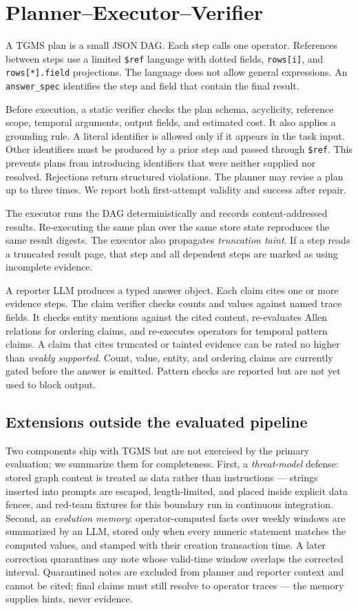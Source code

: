 \documentclass[11pt]{article}
\begin{document}
\section{Planner--Executor--Verifier}
\label{sec:pev}
A TGMS plan is a small JSON DAG. Each step calls one operator. References
between steps use a limited \texttt{\$ref} language with dotted fields,
\texttt{rows[i]}, and \texttt{rows[*].field} projections. The language
does not allow general expressions. An \texttt{answer\_spec} identifies
the step and field that contain the final result.

Before execution, a static verifier checks the plan schema, acyclicity,
reference scope, temporal arguments, output fields, and estimated cost.
It also applies a grounding rule. A literal identifier is allowed only if
it appears in the task input. Other identifiers must be produced by a
prior step and passed through \texttt{\$ref}. This prevents plans from
introducing identifiers that were neither supplied nor resolved.
Rejections return structured violations. The planner may revise a plan up
to three times. We report both first-attempt validity and success after
repair.

The executor runs the DAG deterministically and records
content-addressed results. Re-executing the same plan over the same store
state reproduces the same result digests. The executor also propagates
\emph{truncation taint}. If a step reads a truncated result page, that
step and all dependent steps are marked as using incomplete evidence.

A reporter LLM produces a typed answer object. Each claim cites one or
more evidence steps. The claim verifier checks counts and values against
named trace fields. It checks entity mentions against the cited content,
re-evaluates Allen relations for ordering claims, and re-executes
operators for temporal pattern claims. A claim that cites truncated or
tainted evidence can be rated no higher than \emph{weakly supported}.
Count, value, entity, and ordering claims are currently gated before the
answer is emitted. Pattern checks are reported but are not yet used to
block output.

\subsection{Extensions outside the evaluated pipeline}
Two components ship with TGMS but are not exercised by the primary
evaluation; we summarize them for completeness. First, a
\emph{threat-model} defense: stored graph content is treated as data
rather than instructions --- strings inserted into prompts are escaped,
length-limited, and placed inside explicit data fences, and red-team
fixtures for this boundary run in continuous integration. Second, an
\emph{evolution memory}: operator-computed facts over weekly windows
are summarized by an LLM, stored only when every numeric statement
matches the computed values, and stamped with their creation
transaction time. A later correction quarantines any note whose
valid-time window overlaps the corrected interval. Quarantined notes
are excluded from planner and reporter context and cannot be cited;
final claims must still resolve to operator traces --- the memory
supplies hints, never evidence.
\end{document}
